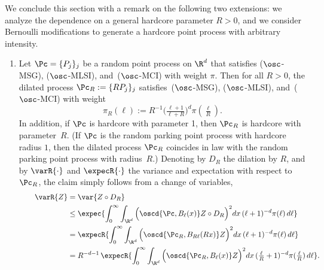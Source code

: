 \begin{rema}\label{lem:general-hardcore/decimated}
We conclude this section with a remark on the following two extensions: we analyze the dependence on a general hardcore parameter $R>0$, and we consider Bernoulli modifications to generate a hardcore point process with arbitrary intensity.
\begin{enumerate}\alphenumi
\item \label{rema3.4.1} Let $\Pc=\{P_j\}_j$ be a random point process on $\R^d$ that satisfies {($\osc$-MSG)}, {($\osc$-MLSI)}, and~{($\osc$-MCI)} with weight $\pi$. Then for all $R>0$, the dilated process $\Pc_R:=\{RP_j\}_j$ satisfies~{($\osc$-MSG)}, {($\osc$-MLSI)}, and~{($\osc$-MCI)} with weight
\[
\pi_R(\ell):= R^{-1} \big(\tfrac{\ell+1} {\ell+ R}\big)^{d}\pi(\tfrac \ell R).
\]
In addition, if $\Pc$ is hardcore with parameter 1, then $\Pc_R$ is hardcore with parameter~$R$. (If $\Pc$ is the random parking point process with hardcore radius $1$, then the dilated process $\Pc_R$ coincides in law with the random parking point process with radius~$R$.) Denoting by $D_R$ the dilation by $R$, and by $\varR{\cdot}$ and $\expecR{\cdot}$ the variance and expectation with respect to $\Pc_R$, the claim simply follows from a change of variables,
\begin{align*}
\qquad\varR{Z}&=\var{Z\circ D_R}\\
&\le \expec{\int_0^\infty\int_{\R^d} \Big(\oscd{\Pc,B_\ell(x)}Z\circ D_R\Big)^2dx\,(\ell+1)^{-d} \pi(\ell)\,d\ell}
\\
&=\expecR{\int_0^\infty\int_{\R^d} \Big(\oscd{\Pc_R,B_{R\ell}(Rx)}Z\Big)^2dx\, (\ell+1)^{-d} \pi(\ell)\,d\ell}
\\
&=R^{-d-1}\,\expecR{\int_0^\infty\int_{\R^d} \Big(\oscd{\Pc_R,B_{\ell}(x)}Z\Big)^2dx\, (\tfrac\ell R+1)^{-d} \pi(\tfrac\ell R)\,d\ell}.
\end{align*}


\end{enumerate}
\end{rema}
